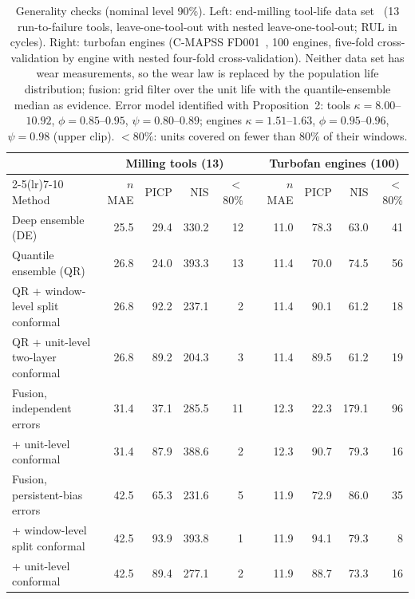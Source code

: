 \begin{table}[!tbp]
\centering
\caption{Generality checks (nominal level 90\%). Left: end-milling tool-life data set~\cite{scidata25} (13 run-to-failure tools, leave-one-tool-out with nested leave-one-tool-out; RUL in cycles). Right: turbofan engines (C-MAPSS FD001~\cite{saxena08}, 100 engines, five-fold cross-validation by engine with nested four-fold cross-validation). Neither data set has wear measurements, so the wear law is replaced by the population life distribution; fusion: grid filter over the unit life with the quantile-ensemble median as evidence. Error model identified with Proposition~2: tools $\kappa=8.00$--$10.92$, $\phi=0.85$--$0.95$, $\psi=0.80$--$0.89$; engines $\kappa=1.51$--$1.63$, $\phi=0.95$--$0.96$, $\psi=0.98$ (upper clip). $<$80\%: units covered on fewer than 80\% of their windows.}
\label{tab:cmapss}
\footnotesize\setlength{\tabcolsep}{3.2pt}
\begin{tabular}{lrrrrrrrrr}
\toprule
 & \multicolumn{4}{c}{Milling tools (13)} & & \multicolumn{4}{c}{Turbofan engines (100)}\\
\cmidrule(lr){2-5}\cmidrule(lr){7-10}
Method & $n$MAE & PICP & NIS & $<$80\% & & $n$MAE & PICP & NIS & $<$80\%\\
\midrule
Deep ensemble (DE) & 25.5 & 29.4 & 330.2 & 12 &  & 11.0 & 78.3 & 63.0 & 41\\
Quantile ensemble (QR) & 26.8 & 24.0 & 393.3 & 13 &  & 11.4 & 70.0 & 74.5 & 56\\
QR + window-level split conformal & 26.8 & 92.2 & 237.1 & 2 &  & 11.4 & 90.1 & 61.2 & 18\\
QR + unit-level two-layer conformal & 26.8 & 89.2 & 204.3 & 3 &  & 11.4 & 89.5 & 61.2 & 19\\
Fusion, independent errors & 31.4 & 37.1 & 285.5 & 11 &  & 12.3 & 22.3 & 179.1 & 96\\
\quad + unit-level conformal & 31.4 & 87.9 & 388.6 & 2 &  & 12.3 & 90.7 & 79.3 & 16\\
Fusion, persistent-bias errors & 42.5 & 65.3 & 231.6 & 5 &  & 11.9 & 72.9 & 86.0 & 35\\
\quad + window-level split conformal & 42.5 & 93.9 & 393.8 & 1 &  & 11.9 & 94.1 & 79.3 & 8\\
\quad + unit-level conformal & 42.5 & 89.4 & 277.1 & 2 &  & 11.9 & 88.7 & 73.3 & 16\\
\bottomrule
\end{tabular}
\end{table}
